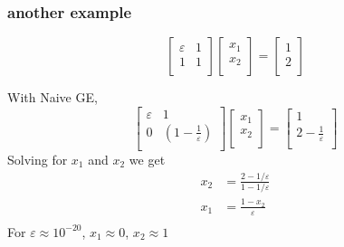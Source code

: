 \documentclass[10pt]{beamer}
\begin{document}
\begin{frame}
\frametitle{another example}
\begin{equation*}
\begin{bmatrix}
  \varepsilon & 1\\
  1 & 1\\
\end{bmatrix}
\begin{bmatrix}
  x_1\\
  x_2\\
\end{bmatrix}
=
\begin{bmatrix}
  1\\
  2\\
\end{bmatrix}
\end{equation*}
\begin{example}
With Naive GE,
\begin{equation*}
\begin{bmatrix}
  \varepsilon & 1\\
  0 & (1-\frac{1}{\varepsilon})\\
\end{bmatrix}
\begin{bmatrix}
  x_1\\
  x_2\\
\end{bmatrix}
=
\begin{bmatrix}
  1\\
  2-\frac{1}{\varepsilon}\\
\end{bmatrix}
\end{equation*}
Solving for $x_1$ and $x_2$ we get
\begin{align*}
  x_2 & = \frac{2-1/\varepsilon}{1-1/\varepsilon}\\
  x_1 & = \frac{1-x_2}{\varepsilon}\\
\end{align*}
For $\varepsilon \approx 10^{-20}$, $x_1 \approx 0$, $x_2 \approx 1$
\end{example}
\end{frame}
\end{document}
